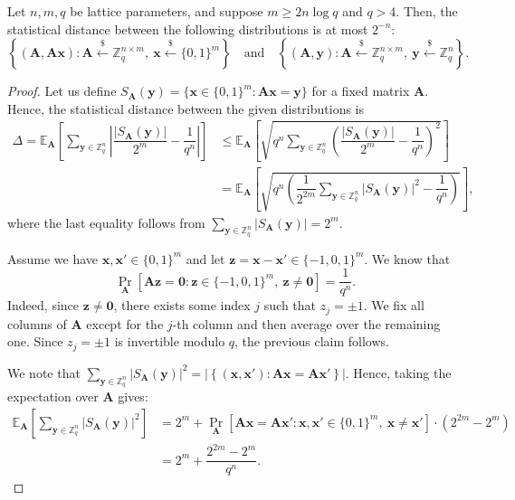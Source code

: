 \begin{lemma}
\label{lem:leftoverHash}
Let $n,m,q$ be lattice parameters, and suppose $m \ge 2n \log q$ and $q > 4$. Then, the statistical distance between the following distributions is at most $2^{-n}$:
\[
\left\{(\mathbf A,\mathbf A\mathbf x) : \mathbf A \xleftarrow{\$} \mathbb Z_q^{n\times m},\ \mathbf x \xleftarrow{\$} \{0,1\}^m \right\}
\quad \text{and} \quad
\left\{(\mathbf A,\mathbf y) : \mathbf A \xleftarrow{\$} \mathbb Z_q^{n\times m},\ \mathbf y \xleftarrow{\$} \mathbb Z_q^n \right\}.
\]

\end{lemma}
\begin{proof}
Let us define
$S_{\mathbf A}(\mathbf y)=\{\mathbf x \in \{0,1\}^m : \mathbf A\mathbf x=\mathbf y\}$
for a fixed matrix $\mathbf A$. Hence, the statistical distance between the given distributions is
$$
\begin{aligned}
\Delta
=
\mathbb E_{\mathbf A}
\left[
\sum_{\mathbf y \in \mathbb Z_q^n}
\left|
\dfrac{|S_{\mathbf A}(\mathbf y)|}{2^m}
-
\dfrac{1}{q^n}
\right|
\right]
&\leq
\mathbb E_{\mathbf A}
\left[
\sqrt{
q^n
\sum_{\mathbf y \in \mathbb Z_q^n}
\left(
\dfrac{|S_{\mathbf A}(\mathbf y)|}{2^m}
-
\dfrac{1}{q^n}
\right)^2
}
\right]
\\
&=
\mathbb E_{\mathbf A}
\left[
\sqrt{
q^n
\left(
\dfrac{1}{2^{2m}}
\sum_{\mathbf y \in \mathbb Z_q^n}
|S_{\mathbf A}(\mathbf y)|^2
-
\dfrac{1}{q^n}
\right)
}
\right],
\end{aligned}
$$
where the last equality follows from $\sum_{\mathbf y \in \mathbb Z_q^n}
|S_{\mathbf A}(\mathbf y)|
=
2^m.$

Assume we have $\mathbf x,\mathbf x' \in \{0,1\}^m$ and let
$\mathbf z = \mathbf x-\mathbf x' \in \{-1,0,1\}^m$.
We know that
$$
\Pr_{\mathbf A}
\left[
\mathbf A\mathbf z = \mathbf 0
:
\mathbf z \in \{-1,0,1\}^m,\ \mathbf z \neq \mathbf 0
\right]
=
\dfrac{1}{q^n}.
$$
Indeed, since $\mathbf z \neq \mathbf 0$, there exists some index $j$ such that $z_j=\pm 1$.
We fix all columns of $\mathbf A$ except for the $j$-th column and then average over the remaining one.
Since $z_j=\pm 1$ is invertible modulo $q$, the previous claim follows.

We note that
$
\sum_{\mathbf y \in \mathbb Z_q^n}
|S_{\mathbf A}(\mathbf y)|^2
=
\left|
\left\{
(\mathbf x,\mathbf x')
:
\mathbf A\mathbf x = \mathbf A\mathbf x'
\right\}
\right|.
$
Hence, taking the expectation over $\mathbf A$ gives:
$$
\begin{aligned}
\mathbb E_{\mathbf A}
\left[
\sum_{\mathbf y \in \mathbb Z_q^n}
|S_{\mathbf A}(\mathbf y)|^2
\right]
&=
2^m
+
\Pr_{\mathbf A}
\left[
\mathbf A\mathbf x=\mathbf A\mathbf x'
:
\mathbf x,\mathbf x' \in \{0,1\}^m,\ \mathbf x \neq \mathbf x'
\right]
\cdot
(2^{2m}-2^m)
\\
&=
2^m
+
\dfrac{2^{2m}-2^m}{q^n}.
\end{aligned}
$$


\end{proof}
